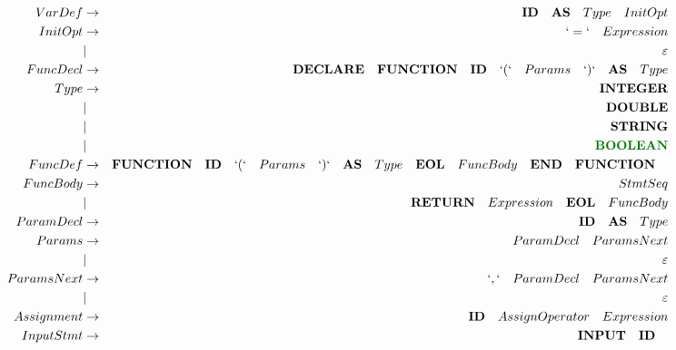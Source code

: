 \documentclass[a4paper,11pt,landscape,leqno]{article}
\begin{document}
\begin{eqnarray}
VarDef      & \rightarrow       & \textbf{ID}\quad \textbf{AS}\quad Type \quad InitOpt\\
InitOpt     &      \rightarrow  & `=`\quad Expression \\
            &       |           & \varepsilon \\
FuncDecl&  \rightarrow      & \textbf{DECLARE}\quad \textbf{FUNCTION}\quad \textbf{ID}\quad `(` \quad Params \quad`)`\quad \textbf{AS}\quad Type   \\
Type &    \rightarrow &    \textbf{INTEGER}    \\
            &       |           & \textbf{DOUBLE}   \\
            &       |           & \textbf{STRING}   \\
            &       |           & \textcolor{green1}{\textbf{BOOLEAN}}  \\
FuncDef    &    \rightarrow    & \textbf{FUNCTION}\quad \textbf{ID}\quad `(`\quad Params\quad `)`\quad \textbf{AS}\quad Type\quad \textbf{EOL}\quad FuncBody\quad \textbf{END}\quad \textbf{FUNCTION}\quad \\
FuncBody    &    \rightarrow    &    StmtSeq  \\
&   |       & \textbf{RETURN}\quad Expression \quad\textbf{EOL}\quad FuncBody    \\
{ParamDecl}   &   \rightarrow   & {\textbf{ID}\quad \textbf{AS}\quad Type}    \\
Params      &    \rightarrow    & {ParamDecl}\quad ParamsNext  \\
            &    |              & \varepsilon             \\
ParamsNext  &    \rightarrow    & `,`\quad {ParamDecl}\quad  ParamsNext   \\
            &    |              & \varepsilon             \\
Assignment  & \rightarrow       & \textbf{ID}\quad AssignOperator \quad Expression \\
InputStmt   &    \rightarrow    & \textbf{INPUT}\quad \textbf{ID}\quad   \\

\end{eqnarray}
\end{document}
